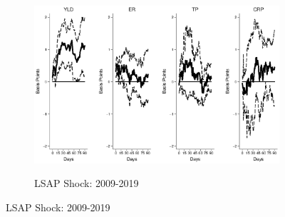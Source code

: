 \documentclass{article}
\begin{document}
\begin{figure}[tbph]
	\begin{subfigure}[t]{\textwidth}
		\begin{center}
			\includegraphics[trim={0cm 0cm 0cm 0cm},clip,height=0.26\textheight,width=1\textwidth]{../Figures/LPs/LagDep-FX/LSAP/EM/LSAPEMnomyptpphi24m.eps} \\
			\caption{LSAP Shock: 2009-2019} \label{subfig:LPEM2Ylsap}
		\end{center}
	\end{subfigure}

\end{figure}

\pagebreak[4]
\end{document}
